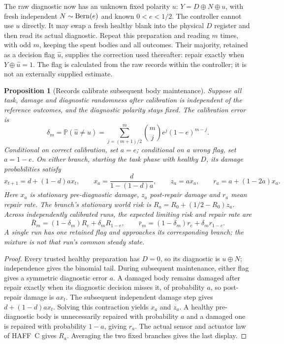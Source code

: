 \documentclass[11pt,a4paper]{article}
\newtheorem{proposition}[definition]{Proposition}
\newcommand{\Prb}{\mathbb P}
\begin{document}
The raw diagnostic now has an unknown fixed polarity $u$:
$Y=D\oplus N\oplus u$, with fresh independent
$N\sim{\rm Bern}(e)$ and known $0<e<1/2$.
The controller cannot use $u$ directly. It may swap a fresh healthy blank into the physical $D$ register and then read its actual diagnostic. Repeat this preparation and reading $m$ times, with odd $m$, keeping the spent bodies and all outcomes. Their majority, retained as a decision flag $\hat u$, supplies the correction used thereafter:
repair exactly when $Y\oplus\hat u=1$.
The flag is calculated from the raw records within the controller; it is not an externally supplied estimate.

\begin{proposition}[Records calibrate subsequent body maintenance]
\label{prop:bodycal}
Suppose all task, damage and diagnostic randomness after calibration is independent of the reference outcomes, and the diagnostic polarity stays fixed. The calibration error is
\[
 \delta_m=\Prb(\hat u\ne u)
 =\sum_{j=(m+1)/2}^{m}\binom mj e^j(1-e)^{m-j}.
\]
Conditional on correct calibration, set $a=e$; conditional on a wrong flag, set $a=1-e$. On either branch, starting the task phase with healthy $D$, its damage probabilities satisfy
\[
 x_{t+1}=d+(1-d)a x_t,\qquad
 x_a=\frac{d}{1-(1-d)a},\qquad
 z_a=a x_a,\qquad
 r_a=a+(1-2a)x_a .
\]
Here $x_a$ is stationary pre-diagnostic damage, $z_a$ post-repair damage and $r_a$ mean repair rate. The branch's stationary world risk is
$R_a=R_0+(1/2-R_0)z_a$.
Across independently calibrated runs, the expected limiting risk and repair rate are
\[
 \bar R_m=(1-\delta_m)R_e+\delta_m R_{1-e},
 \qquad
 \bar r_m=(1-\delta_m)r_e+\delta_m r_{1-e}.
\]
A single run has one retained flag and approaches its corresponding branch; the mixture is not that run's common steady state.
\end{proposition}

\begin{proof}
Every trusted healthy preparation has $D=0$, so its diagnostic is $u\oplus N$; independence gives the binomial tail. During subsequent maintenance, either flag gives a symmetric diagnostic error $a$. A damaged body remains damaged after repair exactly when its diagnostic decision misses it, of probability $a$, so post-repair damage is $a x_t$. The subsequent independent damage step gives $d+(1-d)a x_t$. Solving this contraction yields $x_a$ and $z_a$. A healthy pre-diagnostic body is unnecessarily repaired with probability $a$ and a damaged one is repaired with probability $1-a$, giving $r_a$. The actual sensor and actuator law of HAFF~C gives $R_a$. Averaging the two fixed branches gives the last display.
\end{proof}
\end{document}
